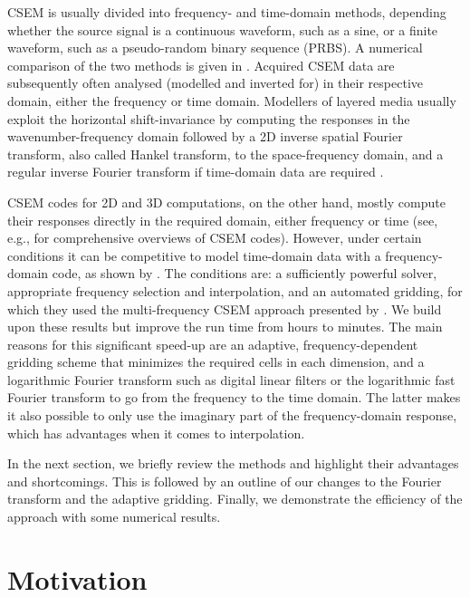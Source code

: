 \documentclass[
    manuscript,
  ]{geophysics}
\begin{document}
CSEM is usually divided into frequency- and time-domain methods, depending
whether the source signal is a continuous waveform, such as a sine, or a finite
waveform, such as a pseudo-random binary sequence (PRBS). A numerical
comparison of the two methods is given in \cite{GP.13.Conell}. Acquired CSEM
data are subsequently often analysed (modelled and inverted for) in their
respective domain, either the frequency or time domain. Modellers of layered
media usually exploit the horizontal shift-invariance by computing the
responses in the wavenumber-frequency domain followed by a 2D inverse spatial
Fourier transform, also called Hankel transform, to the space-frequency domain,
and a regular inverse Fourier transform if time-domain data are required
\citep[e.g., ][]{GEO.15.Hunziker}.

CSEM codes for 2D and 3D computations, on the other hand, mostly compute their
responses directly in the required domain, either frequency or time (see,
e.g., \cite{SG.10.Borner, SG.05.Avdeev} for comprehensive overviews of CSEM
codes). However, under certain conditions it can be competitive to model
time-domain data with a frequency-domain code, as shown by
\cite{GEO.08.Mulder}. The conditions are: a sufficiently powerful solver,
appropriate frequency selection and interpolation, and an automated gridding,
for which they used the multi-frequency CSEM approach presented by
\cite{GEO.07.Plessix}. We build upon these results but improve the run time
from hours to minutes. The main reasons for this significant speed-up are an
adaptive, frequency-dependent gridding scheme that minimizes the required cells
in each dimension, and a logarithmic Fourier transform such as digital linear
filters \citep[DLF, ][]{GP.71.Ghosh} or the logarithmic fast Fourier transform
\citep[FFTLog, ][]{RAS.00.Hamilton} to go from the frequency to the time
domain. The latter makes it also possible to only use the imaginary part of the
frequency-domain response, which has advantages when it comes to interpolation.

In the next section, we briefly review the methods and highlight their
advantages and shortcomings. This is followed by an outline of our changes to
the Fourier transform and the adaptive gridding. Finally, we demonstrate the
efficiency of the approach with some numerical results.

\section{Motivation}
\end{document}
